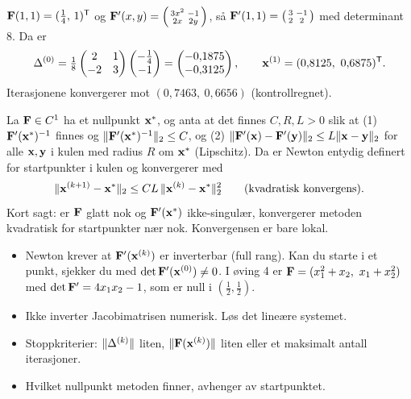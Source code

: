 \begin{eksempel}[forelesningen: $x^3-y+\tfrac14=0$, $x^2+y^2-1=0$, start i $(1,1)$]
$\mathbf{F}(1,1)=(\tfrac14,\,1)^{\mathsf{T}}$ og $\mathbf{F}'(x,y)=\begin{psmallmatrix}3x^2&-1\\2x&2y\end{psmallmatrix}$, så $\mathbf{F}'(1,1)=\begin{psmallmatrix}3&-1\\2&2\end{psmallmatrix}$ med determinant $8$. Da er
\[
\Delta^{(0)}=\tfrac18\begin{pmatrix}2&1\\-2&3\end{pmatrix}\begin{pmatrix}-\tfrac14\\-1\end{pmatrix}=\begin{pmatrix}-0{,}1875\\-0{,}3125\end{pmatrix},\qquad \mathbf{x}^{(1)}=(0{,}8125,\ 0{,}6875)^{\mathsf{T}}.
\]
Iterasjonene konvergerer mot $(0{,}7463,\ 0{,}6656)$ (kontrollregnet).
\end{eksempel}

\begin{teorem}
La $\mathbf{F}\in C^1$ ha et nullpunkt $\mathbf{x}^*$, og anta at det finnes $C,R,L>0$ slik at
(1) $\mathbf{F}'(\mathbf{x}^*)^{-1}$ finnes og $\lVert \mathbf{F}'(\mathbf{x}^*)^{-1}\rVert_2\le C$, og
(2) $\lVert \mathbf{F}'(\mathbf{x})-\mathbf{F}'(\mathbf{y})\rVert_2\le L\lVert \mathbf{x}-\mathbf{y}\rVert_2$ for alle $\mathbf{x},\mathbf{y}$ i kulen med radius $R$ om $\mathbf{x}^*$ (Lipschitz).
Da er Newton entydig definert for startpunkter i kulen og konvergerer med
\[
\lVert \mathbf{x}^{(k+1)}-\mathbf{x}^*\rVert_2\le CL\,\lVert \mathbf{x}^{(k)}-\mathbf{x}^*\rVert_2^2\qquad\text{(kvadratisk konvergens).}
\]
Kort sagt: er $\mathbf{F}$ glatt nok og $\mathbf{F}'(\mathbf{x}^*)$ ikke-singulær, konvergerer metoden kvadratisk for startpunkter nær nok. Konvergensen er bare lokal.
\end{teorem}

\begin{fallgruve}
\begin{itemize}
  \item Newton krever at $\mathbf{F}'(\mathbf{x}^{(k)})$ er inverterbar (full rang). Kan du starte i et punkt, sjekker du med $\det\mathbf{F}'(\mathbf{x}^{(0)})\neq0$. I øving 4 er $\mathbf{F}=(x_1^2+x_2,\ x_1+x_2^2)$ med $\det\mathbf{F}'=4x_1x_2-1$, som er null i $(\tfrac12,\tfrac12)$.
  \item Ikke inverter Jacobimatrisen numerisk. Løs det lineære systemet.
  \item Stoppkriterier: $\lVert \Delta^{(k)}\rVert$ liten, $\lVert \mathbf{F}(\mathbf{x}^{(k)})\rVert$ liten eller et maksimalt antall iterasjoner.
  \item Hvilket nullpunkt metoden finner, avhenger av startpunktet.
\end{itemize}
\end{fallgruve}


